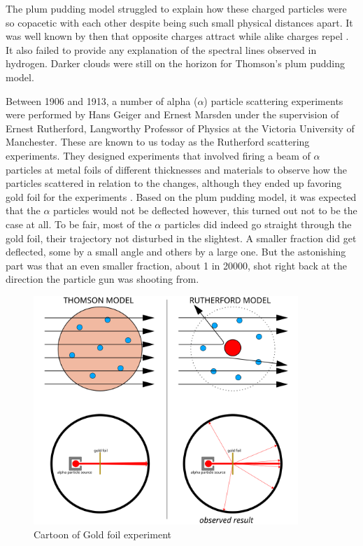 The plum pudding model struggled to explain how these charged particles were so copacetic with each other despite being such small physical distances apart.
It was well known by then that opposite charges attract while alike charges repel \cite{Nagaoka}.
It also failed to provide any explanation of the spectral lines observed in hydrogen\cite{Thomson_1907}.
Darker clouds were still on the horizon for Thomson's plum pudding model.

Between 1906 and 1913, a number of alpha ($\alpha$) particle scattering experiments were performed by Hans Geiger and Ernest Marsden under the supervision of Ernest Rutherford, Langworthy Professor of Physics at the Victoria University of Manchester. 
These are known to us today as the Rutherford scattering experiments.
They designed experiments that involved firing a beam of $\alpha$ particles at metal foils of different thicknesses and materials to observe how the particles scattered in relation to the changes, although they ended up favoring gold foil for the experiments \cite{Tibbetts}. 
Based on the plum pudding model, it was expected that the $\alpha$ particles would not be deflected however, this turned out not to be the case at all.
To be fair, most of the $\alpha$ particles did indeed go straight through the gold foil, their trajectory not disturbed in the slightest.
A smaller fraction did get deflected, some by a small angle and others by a large one\cite{Belyaev_Ross}.
But the astonishing part was that an even smaller fraction, about 1 in 20000, shot right back at the direction the particle gun was shooting from\cite{Atomic_Nucleus}.

\begin{figure}[H]
  \centering
  \includegraphics[width=100mm]{figures/goldFoil.png}
  \caption{Cartoon of Gold foil experiment\cite{GM_Experiment}}
  \label{goldFoil}
\end{figure}

